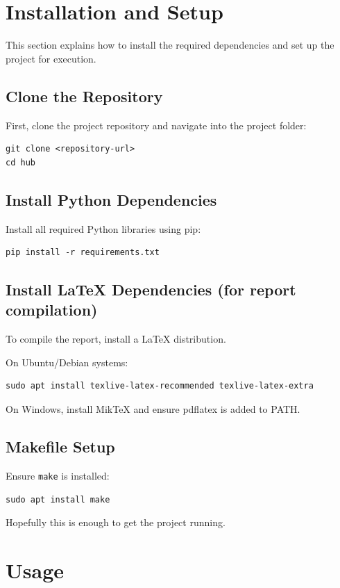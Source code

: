 \documentclass[12pt,a4paper]{article}
\begin{document}
\section{Installation and Setup}

This section explains how to install the required dependencies and set up the project for execution.

\subsection{Clone the Repository}
First, clone the project repository and navigate into the project folder:

\begin{verbatim}
git clone <repository-url>
cd hub
\end{verbatim}

\subsection{Install Python Dependencies}
Install all required Python libraries using pip:

\begin{verbatim}
pip install -r requirements.txt
\end{verbatim}

\subsection{Install LaTeX Dependencies (for report compilation)}
To compile the report, install a LaTeX distribution.

On Ubuntu/Debian systems:
\begin{verbatim}
sudo apt install texlive-latex-recommended texlive-latex-extra
\end{verbatim}

On Windows, install MikTeX and ensure pdflatex is added to PATH.

\subsection{Makefile Setup}
Ensure \texttt{make} is installed:

\begin{verbatim}
sudo apt install make
\end{verbatim}

Hopefully this is enough to get the project running.

\section{Usage}
\end{document}
